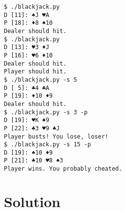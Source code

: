 \documentclass[]{article}
\begin{document}
\begin{verbatim}
$ ./blackjack.py
D [11]: ♠J ♥A
P [18]: ♦8 ♠10
Dealer should hit.
$ ./blackjack.py
D [13]: ♥3 ♦J
P [16]: ♥6 ♦10
Dealer should hit.
Player should hit.
$ ./blackjack.py -s 5
D [ 5]: ♣4 ♣A
P [19]: ♦10 ♦9
Dealer should hit.
$ ./blackjack.py -s 3 -p
D [19]: ♥K ♠9
P [22]: ♣3 ♥9 ♣J
Player busts! You lose, loser!
$ ./blackjack.py -s 15 -p
D [19]: ♠10 ♦9
P [21]: ♣10 ♥8 ♠3
Player wins. You probably cheated.
\end{verbatim}

\pagebreak

\hypertarget{solution-13}{%
\section{Solution}\label{solution-13}}
\end{document}

